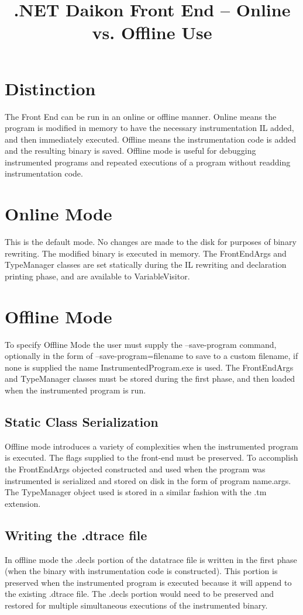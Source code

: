 \documentclass{article}
\title{.NET Daikon Front End -- Online vs. Offline Use}
\begin{document}
\maketitle

\section{Distinction}
The Front End can be run in an online or offline manner. Online means the program is modified in memory to have the necessary instrumentation IL added, and then immediately executed. Offline means the instrumentation code is added and the resulting binary is saved. Offline mode is useful for debugging instrumented programs and repeated executions of a program without readding instrumentation code.

\section{Online Mode}
This is the default mode. No changes are made to the disk for purposes of binary rewriting. The modified binary is executed in memory. The FrontEndArgs and TypeManager classes are set statically during the IL rewriting and declaration printing phase, and are available to VariableVisitor.

\section{Offline Mode}
To specify Offline Mode the user must supply the --save-program command, optionally in the form of --save-program=filename to save to a custom filename, if none is supplied the name InstrumentedProgram.exe is used. The FrontEndArgs and TypeManager classes must be stored during the first phase, and then loaded when the instrumented program is run.

\subsection{Static Class Serialization}
Offline mode introduces a variety of complexities when the instrumented program is executed. The flags supplied to the front-end must be preserved. To accomplish the FrontEndArgs objected constructed and used when the program was instrumented is serialized and stored on disk in the form of {program name}.args. The TypeManager object used is stored in a similar fashion with the .tm extension.

\subsection{Writing the .dtrace file}
In offline mode the .decls portion of the datatrace file is written in the first phase (when the binary with instrumentation code is constructed). This portion is preserved when the instrumented program is executed because it will append to the existing .dtrace file. The .decls portion would need to be preserved and restored for multiple simultaneous executions of the instrumented binary.
\end{document}
